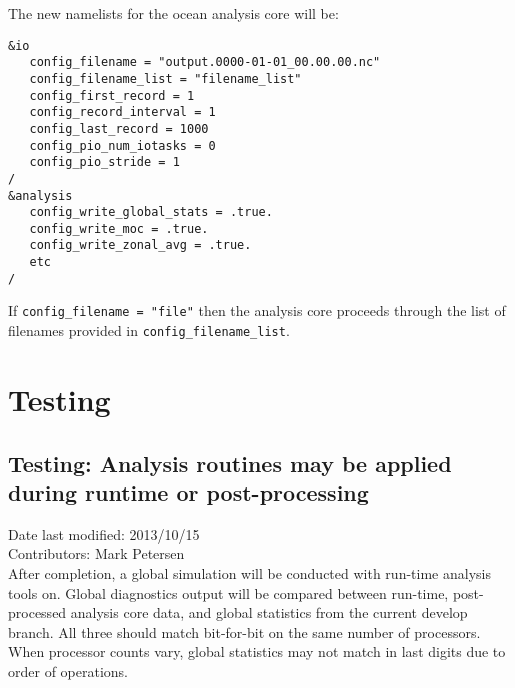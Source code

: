 \documentclass[11pt]{report}
\begin{document}
The new namelists for the ocean analysis core will be:
\begin{verbatim}
&io
   config_filename = "output.0000-01-01_00.00.00.nc"
   config_filename_list = "filename_list"
   config_first_record = 1
   config_record_interval = 1
   config_last_record = 1000
   config_pio_num_iotasks = 0
   config_pio_stride = 1
/
&analysis
   config_write_global_stats = .true.
   config_write_moc = .true.
   config_write_zonal_avg = .true.
   etc
/
\end{verbatim}

If \verb|config_filename = "file"| then the analysis core proceeds through the list of filenames provided in 
\verb|config_filename_list|.

\chapter{Testing}

\section{Testing: Analysis routines may be applied during runtime or post-processing}
Date last modified: 2013/10/15 \\
Contributors: Mark Petersen \\

After completion, a global simulation will be conducted with run-time analysis tools on.  Global diagnostics output will be compared between run-time, post-processed analysis core data, and global statistics from the current develop branch.  All three should match bit-for-bit on the same number of processors.  When processor counts vary, global statistics may not match in last digits due to order of operations.



\end{document}
